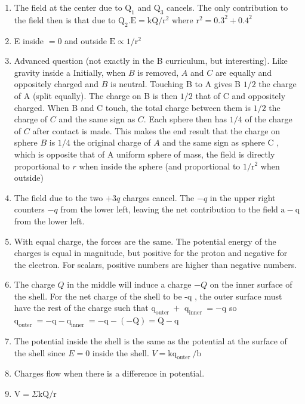\begin{enumerate}
\begin{enumerate}
  \item The field at the center due to $\mathrm{Q}_{1}$ and $\mathrm{Q}_{3}$ cancels. The only contribution to the field then is that due to $\mathrm{Q}_{2} . \mathrm{E}=\mathrm{kQ} / \mathrm{r}^{2}$ where $\mathrm{r}^{2}=0.3^{2}+0.4^{2}$
  \item E inside $=0$ and outside $\mathrm{E} \propto 1 / \mathrm{r}^{2}$
  \item Advanced question (not exactly in the B curriculum, but interesting). Like gravity inside a Initially, when $B$ is removed, $A$ and $C$ are equally and oppositely charged and $B$ is neutral. Touching B to A gives B $1 / 2$ the charge of A (split equally). The charge on B is then $1 / 2$ that of C and oppositely charged. When B and C touch, the total charge between them is $1 / 2$ the charge of $C$ and the same sign as $C$. Each sphere then has $1 / 4$ of the charge of $C$ after contact is made. This makes the end result that the charge on sphere $B$ is $1 / 4$ the original charge of $A$ and the same sign as sphere C , which is opposite that of A uniform sphere of mass, the field is directly proportional to $r$ when inside the sphere (and proportional to $1 / \mathrm{r}^{2}$ when outside)
  \item The field due to the two $+3 q$ charges cancel. The $-q$ in the upper right counters $-q$ from the lower left, leaving the net contribution to the field $\mathrm{a}-\mathrm{q}$ from the lower left.
  \item With equal charge, the forces are the same. The potential energy of the charges is equal in magnitude, but positive for the proton and negative for the electron. For scalars, positive numbers are higher than negative numbers.
  \item The charge $Q$ in the middle will induce a charge $-Q$ on the inner surface of the shell. For the net charge of the shell to be -q , the outer surface must have the rest of the charge such that $\mathrm{q}_{\text {outer }}+$ $\mathrm{q}_{\text {inner }}=-\mathrm{q}$ so $\mathrm{q}_{\text {outer }}=-\mathrm{q}-\mathrm{q}_{\text {inner }}=-\mathrm{q}-(-\mathrm{Q})=\mathrm{Q}-\mathrm{q}$
  \item The potential inside the shell is the same as the potential at the surface of the shell since $E=0$ inside the shell. $V=\mathrm{kq}_{\text {outer }} / \mathrm{b}$
  \item Charges flow when there is a difference in potential.
  \item $\mathrm{V}=\Sigma \mathrm{kQ} / \mathrm{r}$

\end{enumerate}
\end{enumerate}
